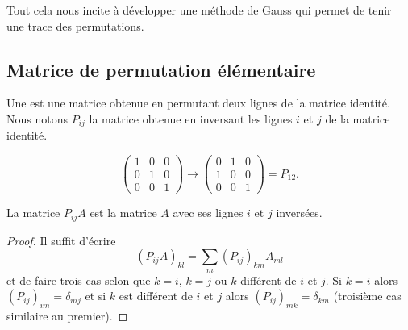 Tout cela nous incite à développer une méthode de Gauss qui permet de tenir une trace des permutations.

\subsection{Matrice de permutation élémentaire}

\begin{definition}
	Une  est une matrice obtenue en permutant deux lignes de la matrice identité. Nous notons \( P_{ij}\) la matrice obtenue en inversant les lignes \( i\) et \( j\) de la matrice identité.
\end{definition}

\begin{example}
	\begin{equation}
		\begin{pmatrix}
			1 & 0 & 0 \\
			0 & 1 & 0 \\
			0 & 0 & 1
		\end{pmatrix}\to
		\begin{pmatrix}
			0 & 1 & 0 \\
			1 & 0 & 0 \\
			0 & 0 & 1
		\end{pmatrix}=P_{12}.
	\end{equation}
\end{example}

\begin{lemma}
	La matrice \( P_{ij}A\) est la matrice \( A\) avec ses lignes \( i\) et \( j\) inversées.
\end{lemma}

\begin{proof}
	Il suffit d'écrire
	\begin{equation}
		(P_{ij}A)_{kl}=\sum_m(P_{ij})_{km}A_{ml}
	\end{equation}
	et de faire trois cas selon que \( k=i\), \( k=j\) ou \( k\) différent de \( i\) et \( j\). Si \( k=i\) alors \( (P_{ij})_{im}=\delta_{mj}\) et si \( k\) est différent de \( i\) et \( j\) alors \( (P_{ij})_{mk}=\delta_{km}\) (troisième cas similaire au premier).
\end{proof}

